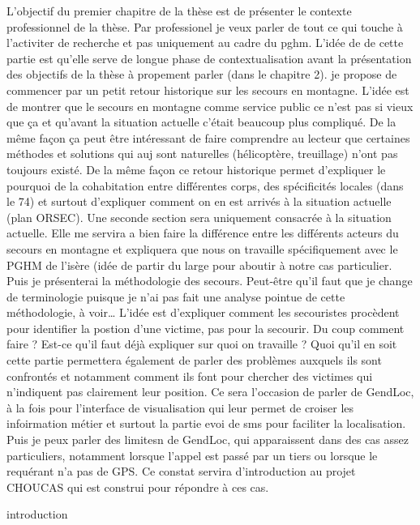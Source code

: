 \chaptertoc{}


L'objectif du premier chapitre de la thèse est de présenter le
contexte professionnel de la thèse. Par professionel je veux parler de
tout ce qui touche à l'activiter de recherche et pas uniquement au
cadre du pghm. L'idée de de cette partie est qu'elle serve de longue
phase de contextualisation avant la présentation des objectifs de la
thèse à propement parler (dans le chapitre 2). je propose de commencer
par un petit retour historique sur les secours en montagne. L'idée est
de montrer que le secours en montagne comme service public ce n'est
pas si vieux que ça et qu'avant la situation actuelle c'était beaucoup
plus compliqué. De la même façon ça peut être intéressant de faire
comprendre au lecteur que certaines méthodes et solutions qui auj sont
naturelles (hélicoptère, treuillage) n'ont pas toujours existé. De la
même façon ce retour historique permet d'expliquer le pourquoi de la
cohabitation entre différentes corps, des spécificités locales (dans
le 74) et surtout d'expliquer comment on en est arrivés à la situation
actuelle (plan ORSEC). Une seconde section sera uniquement consacrée à
la situation actuelle. Elle me servira a bien faire la différence
entre les différents acteurs du secours en montagne et expliquera que
nous on travaille spécifiquement avec le PGHM de l'isère (idée de
partir du large pour aboutir à notre cas particulier. Puis je
présenterai la méthodologie des secours. Peut-être qu'il faut que je
change de terminologie puisque je n'ai pas fait une analyse pointue de
cette méthodologie, à voir… L'idée est d'expliquer comment les
secouristes procèdent pour identifier la postion d'une victime, pas
pour la secourir. Du coup comment faire ? Est-ce qu'il faut déjà
expliquer sur quoi on travaille ? Quoi qu'il en soit cette partie
permettera également de parler des problèmes auxquels ils sont
confrontés et notamment comment ils font pour chercher des victimes
qui n'indiquent pas clairement leur position. Ce sera l'occasion de
parler de GendLoc, à la fois pour l'interface de visualisation qui
leur permet de croiser les infoirmation métier et surtout la partie
evoi de sms pour faciliter la localisation. Puis je peux parler des
limitesn de GendLoc, qui apparaissent dans des cas assez particuliers,
notamment lorsque l'appel est passé par un tiers ou lorsque le
requérant n'a pas de GPS. Ce constat servira d'introduction au projet
CHOUCAS qui est construi pour répondre à ces cas.

\label{sec:1-int}
{introduction}

